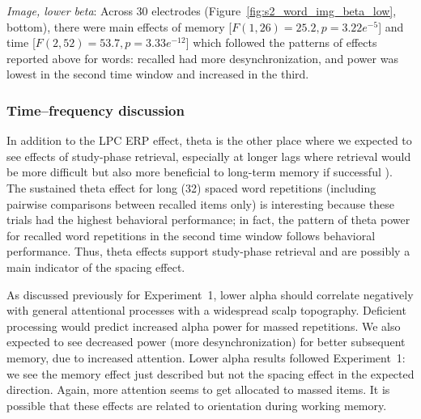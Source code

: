 \textit{Image, lower beta}: Across 30 electrodes (Figure~\ref{fig:s2_word_img_beta_low}, bottom), there were main effects of memory [$F(1,26)=25.2, p=3.22e^{-5}$] and time [$F(2,52)=53.7, p=3.33e^{-12}$] which followed the patterns of effects reported above for words: recalled had more desynchronization, and power was lowest in the second time window and increased in the third.

\subsubsection{Time--frequency discussion}


In addition to the LPC ERP effect, theta is the other place where we expected to see effects of study-phase retrieval,
especially at longer lags where retrieval would be more difficult but also more beneficial to long-term memory if successful
\cite{DelaEtal2010,PavlAnde2005}).
The sustained theta effect for long (32) spaced word repetitions (including pairwise comparisons between recalled items only) is interesting because these trials had the highest behavioral performance; in fact, the pattern of theta power for recalled word repetitions in the second time window follows behavioral performance.  Thus, theta effects support study-phase retrieval and are possibly a main indicator of the spacing effect.



As discussed previously for Experiment~1, lower alpha should correlate negatively with general attentional processes with a widespread scalp topography.  Deficient processing would predict increased alpha power for massed repetitions.  We also expected to see decreased power (more desynchronization) for better subsequent memory, due to increased attention.
Lower alpha results followed Experiment~1: we see the memory effect just described but not the spacing effect in the expected direction.  Again, more attention seems to get allocated to massed items.  It is possible that these effects are related to orientation during working memory.



